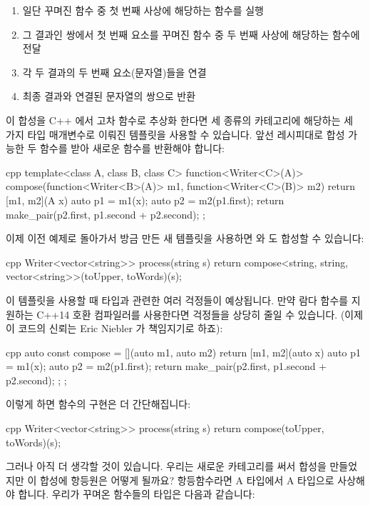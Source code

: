 \begin{enumerate}
\tightlist
\item
  일단 꾸며진 함수 중 첫 번째 사상에 해당하는 함수를 실행
\item
  그 결과인 쌍에서 첫 번째 요소를 꾸며진 함수 중 두 번째 사상에 해당하는 함수에 전달
\item
  각 두 결과의 두 번째 요소(문자열)들을 연결
\item
  최종 결과와 연결된 문자열의 쌍으로 반환
\end{enumerate}

이 합성을 C++ 에서 고차 함수로 추상화 한다면 세 종류의 카테고리에 해당하는 세 가지 타입
매개변수로 이뤄진 템플릿을 사용할 수 있습니다. 앞선 레시피대로 합성 가능한 두 함수를 받아
새로운 함수를 반환해야 합니다:

\begin{snip}{cpp}
template<class A, class B, class C>
function<Writer<C>(A)> compose(function<Writer<B>(A)> m1,
                               function<Writer<C>(B)> m2)
{
    return [m1, m2](A x) {
        auto p1 = m1(x);
        auto p2 = m2(p1.first);
        return make_pair(p2.first, p1.second + p2.second); 
    };
}
\end{snip}
이제 이전 예제로 돌아가서 방금 만든 새 템플릿을 사용하면 와
도 합성할 수 있습니다:

\begin{snip}{cpp}
Writer<vector<string>> process(string s) { 
    return compose<string, string, vector<string>>(toUpper, toWords)(s);
}
\end{snip}
이  템플릿을 사용할 때 타입과 관련한 여러 걱정들이 예상됩니다. 만약 람다
함수를 지원하는 C++14 호환 컴파일러를 사용한다면 걱정들을 상당히 줄일 수 있습니다.
(이제 이 코드의 신뢰는 Eric Niebler 가 책임지기로 하죠):

\begin{snip}{cpp}
auto const compose = [](auto m1, auto m2) { 
    return [m1, m2](auto x) { 
        auto p1 = m1(x);
        auto p2 = m2(p1.first);
        return make_pair(p2.first, p1.second + p2.second);
    };
};
\end{snip}
이렇게 하면  함수의 구현은 더 간단해집니다:

\begin{snip}{cpp}
Writer<vector<string>> process(string s) {
    return compose(toUpper, toWords)(s);
}
\end{snip}
그러나 아직 더 생각할 것이 있습니다. 우리는 새로운 카테고리를 써서 합성을 만들었지만
이 합성에 항등원은 어떻게 될까요? 항등함수라면 A 타입에서 A 타입으로 사상해야 합니다.
우리가 꾸며온 함수들의 타입은 다음과 같습니다:

